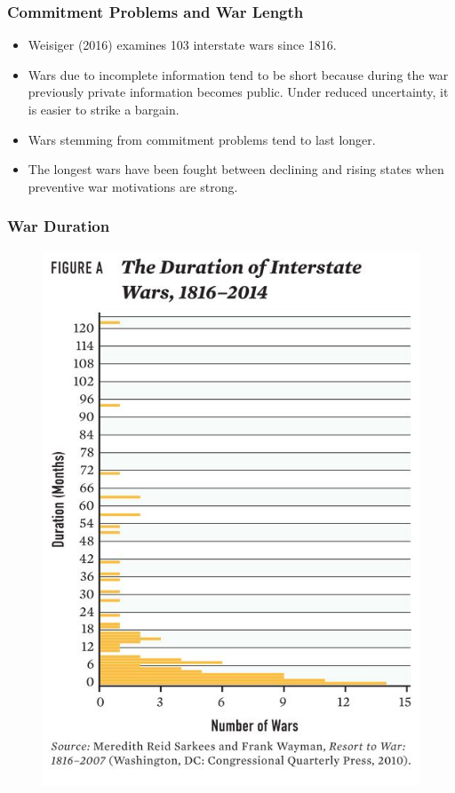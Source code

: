\documentclass{beamer}
\begin{document}
\begin{frame} 
	\frametitle{\LARGE{Commitment Problems and War Length}}
	\begin{itemize}
		\item Weisiger (2016) examines 103 interstate wars since 1816. \pause
		\item Wars due to incomplete information tend to be short because during the war previously private information becomes public. Under reduced uncertainty, it is easier to strike a bargain. \pause
		\item Wars stemming from commitment problems tend to last longer. \pause
		\item The longest wars have been fought between declining and rising states when preventive war motivations are strong.  
	\end{itemize}
\end{frame}

\begin{frame} 
	\frametitle{\LARGE{War Duration}}
	\begin{figure}[ht!]
		\centering
		\includegraphics[width=\textwidth,height=0.8\textheight,keepaspectratio]{war duration.JPG}
	\end{figure}
\end{frame}
\end{document}

